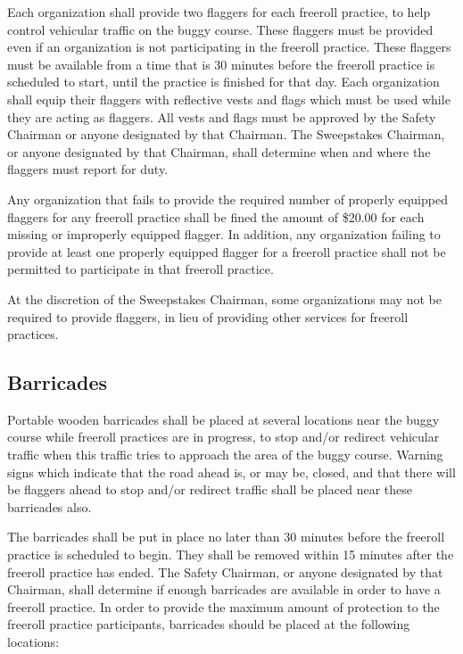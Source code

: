 	Each organization shall provide two flaggers for each freeroll practice, to
	help control vehicular traffic on the buggy course. These flaggers must be
	provided even if an organization is not participating in the freeroll practice.
	These flaggers must be available from a time that is 30 minutes before the
	freeroll practice is scheduled to start, until the practice is finished for
	that day. Each organization shall equip their flaggers with reflective vests
	and flags which must be used while they are acting as flaggers. All vests and
	flags must be approved by the Safety Chairman or anyone designated by that
	Chairman. The Sweepstakes Chairman, or anyone designated by that Chairman,
	shall determine when and where the flaggers must report for duty.

	Any organization that fails to provide the required number of properly equipped
	flaggers for any freeroll practice shall be fined the amount of \$20.00 for
	each missing or improperly equipped flagger. In addition, any organization
	failing to provide at least one properly equipped flagger for a freeroll
	practice shall not be permitted to participate in that freeroll practice.

	At the discretion of the Sweepstakes Chairman, some organizations may not be
	required to provide flaggers, in lieu of providing other services for freeroll
	practices.

\subsection{Barricades}

	Portable wooden barricades shall be placed at several locations near the buggy
	course while freeroll practices are in progress, to stop and/or redirect
	vehicular traffic when this traffic tries to approach the area of the buggy
	course. Warning signs which indicate that the road ahead is, or may be, closed,
	and that there will be flaggers ahead to stop and/or redirect traffic shall be
	placed near these barricades also.

	The barricades shall be put in place no later than 30 minutes before the
	freeroll practice is scheduled to begin. They shall be removed within 15
	minutes after the freeroll practice has ended. The Safety Chairman, or anyone
	designated by that Chairman, shall determine if enough barricades are available
	in order to have a freeroll practice. In order to provide the maximum amount of
	protection to the freeroll practice participants, barricades should be placed
	at the following locations:

